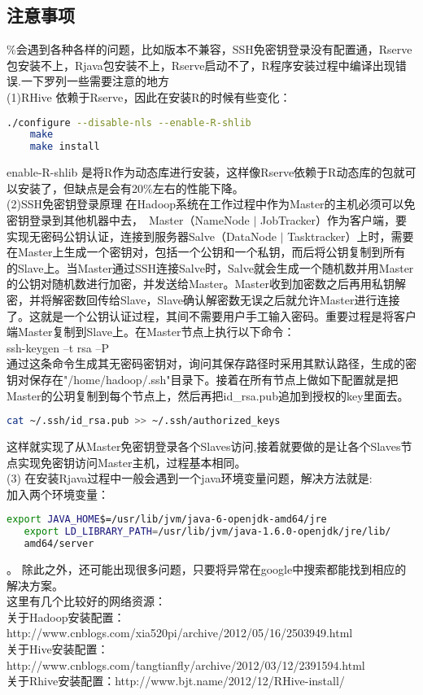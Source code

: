 \documentclass[12pt]{article}
\begin{document}
\begin{CJK*}{UTF8}{gbsn}
\subsection{注意事项}
\%会遇到各种各样的问题，比如版本不兼容，SSH免密钥登录没有配置通，Rserve包安装不上，Rjava包安装不上，Rserve启动不了，R程序安装过程中编译出现错误.一下罗列一些需要注意的地方\\
\indent (1)RHive 依赖于Rserve，因此在安装R的时候有些变化：
\begin{lstlisting}[language=sh]
    ./configure --disable-nls --enable-R-shlib
    make
    make install
\end{lstlisting}
enable-R-shlib 是将R作为动态库进行安装，这样像Rserve依赖于R动态库的包就可以安装了，但缺点是会有20\%左右的性能下降。\\
\indent (2)SSH免密钥登录原理
在Hadoop系统在工作过程中作为Master的主机必须可以免密钥登录到其他机器中去，　Master（NameNode $|$ JobTracker）作为客户端，要实现无密码公钥认证，连接到服务器Salve（DataNode $|$ Tasktracker）上时，需要在Master上生成一个密钥对，包括一个公钥和一个私钥，而后将公钥复制到所有的Slave上。当Master通过SSH连接Salve时，Salve就会生成一个随机数并用Master的公钥对随机数进行加密，并发送给Master。Master收到加密数之后再用私钥解密，并将解密数回传给Slave，Slave确认解密数无误之后就允许Master进行连接了。这就是一个公钥认证过程，其间不需要用户手工输入密码。重要过程是将客户端Master复制到Slave上。在Master节点上执行以下命令：\\
    \indent ssh-keygen –t rsa –P \\
通过这条命令生成其无密码密钥对，询问其保存路径时采用其默认路径，生成的密钥对保存在"/home/hadoop/.ssh"目录下。接着在所有节点上做如下配置就是把Master的公玥复制到每个节点上，然后再把id\_rsa.pub追加到授权的key里面去。
\begin{lstlisting}[language=sh]
      cat ~/.ssh/id_rsa.pub >> ~/.ssh/authorized_keys
\end{lstlisting}
这样就实现了从Master免密钥登录各个Slaves访问,接着就要做的是让各个Slaves节点实现免密钥访问Master主机，过程基本相同。\\
\indent (3) 在安装Rjava过程中一般会遇到一个java环境变量问题，解决方法就是:\\
   加入两个环境变量：
\begin{lstlisting}[language=sh]
   export JAVA_HOME$=/usr/lib/jvm/java-6-openjdk-amd64/jre
   export LD_LIBRARY_PATH=/usr/lib/jvm/java-1.6.0-openjdk/jre/lib/
   amd64/server
\end{lstlisting}
。
除此之外，还可能出现很多问题，只要将异常在google中搜索都能找到相应的解决方案。\\ 这里有几个比较好的网络资源：\\    
   关于Hadoop安装配置：http://www.cnblogs.com/xia520pi/archive/2012/05/16/2503949.html \\
   关于Hive安装配置：http://www.cnblogs.com/tangtianfly/archive/2012/03/12/2391594.html \\
   关于Rhive安装配置：http://www.bjt.name/2012/12/RHive-install/   

\end{CJK*}
\end{document}
